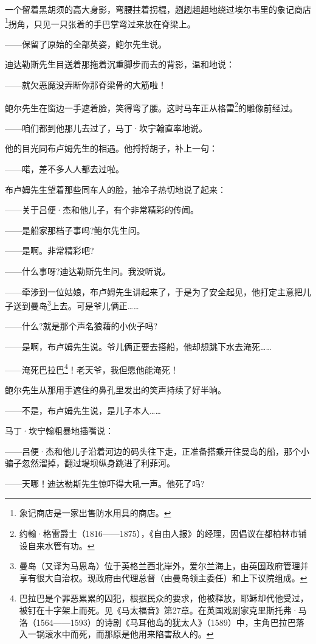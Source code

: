 \par 一个留着黑胡须的高大身影，弯腰拄着拐棍，趔趔趄趄地绕过埃尔韦里的象记商店\footnote{象记商店是一家出售防水用具的商店。}拐角，只见一只张着的手巴掌弯过来放在脊梁上。
\par ——保留了原始的全部英姿，鲍尔先生说。
\par 迪达勒斯先生目送着那拖着沉重脚步而去的背影，温和地说：
\par ——就欠恶魔没弄断你那脊梁骨的大筋啦！
\par 鲍尔先生在窗边一手遮着脸，笑得弯了腰。这时马车正从格雷\footnote{约翰·格雷爵士（1816——1875），《自由人报》的经理，因倡议在都柏林市铺设自来水管有功。}的雕像前经过。
\par ——咱们都到他那儿去过了，马丁·坎宁翰直率地说。
\par 他的目光同布卢姆先生的相遇。他捋捋胡子，补上一句：
\par ——喏，差不多人人都去过啦。
\par 布卢姆先生望着那些同车人的脸，抽冷子热切地说了起来：
\par ——关于吕便·杰和他儿子，有个非常精彩的传闻。
\par ——是船家那档子事吗?鲍尔先生问。
\par ——是啊。非常精彩吧?
\par ——什么事呀?迪达勒斯先生问。我没听说。
\par ——牵涉到一位姑娘，布卢姆先生讲起来了，于是为了安全起见，他打定主意把儿子送到曼岛\footnote{曼岛（又译为马恩岛）位于英格兰西北岸外，爱尔兰海上，由英国政府管理并享有很大自治权。现政府由代理总督（由曼岛领主委任）和上下议院组成。}上去。可是爷儿俩正……
\par ——什么?就是那个声名狼藉的小伙子吗?
\par ——是啊，布卢姆先生说。爷儿俩正要去搭船，他却想跳下水去淹死……
\par ——淹死巴拉巴\footnote{巴拉巴是个罪恶累累的囚犯，根据民众的要求，他被释放，耶稣却代他受过，被钉在十字架上而死。见《马太福音》第27章。在英国戏剧家克里斯托弗·马洛（1564——1593）的诗剧《马耳他岛的犹太人》（1589）中，主角巴拉巴落入一锅滚水中而死，而那原是他用来陷害敌人的。}！老天爷，我但愿他能淹死！
\par 鲍尔先生从那用手遮住的鼻孔里发出的笑声持续了好半晌。
\par ——不是，布卢姆先生说，是儿子本人……
\par 马丁·坎宁翰粗暴地插嘴说：
\par ——吕便·杰和他儿子沿着河边的码头往下走，正准备搭乘开往曼岛的船，那个小骗子忽然溜掉，翻过堤坝纵身跳进了利菲河。
\par ——天哪！迪达勒斯先生惊吓得大吼一声。他死了吗?
